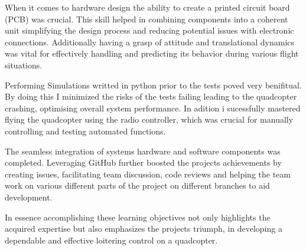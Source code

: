 \documentclass{article}
\begin{document}
When it comes to hardware design the ability to create a printed circuit board
(PCB) was crucial. This skill helped in combining components into a coherent
unit simplifying the design process and reducing potential issues with
electronic connections. Additionally having a grasp of attitude and
translational dynamics was vital for effectively handling and predicting its
behavior during various flight situations.

Performing Simulations writted in python prior to the tests poved very
benifitual. By doing this I minimized the risks of the tests failing leading to
the quadcopter crashing, optimising overall system performance. In adition i
sucessfully mastered flying the quadcopter using the radio controller, which was
crucial for manually controlling and testing automated functions.

The seamless integration of systems hardware and software components was
completed. Leveraging GitHub further boosted the projects achievements by
creating issues, facilitating team discussion, code reviews and helping the team
work on various different parts of the project on different branches to aid
development.

In essence accomplishing these learning objectives not only highlights the
acquired expertise but also emphasizes the projects triumph, in developing a
dependable and effective loitering control on a quadcopter.



\end{document}
